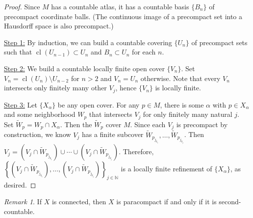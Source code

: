 \documentclass[10pt,letterpaper,cm]{nupset}
\theoremstyle{definition}
\theoremstyle{theorem}
\theoremstyle{remark}
\newtheorem{remark}[definition]{Remark}
\newcommand{\N}{\mathbb N}
\newcommand{\1}{\mathbf{1}}
\newcommand{\0}{\vec 0}
\DeclareMathOperator{\cl}{cl}
\begin{document}
\begin{proof}
Since $M$ has a countable atlas, it has a countable basis $\{B_n\}$ of precompact coordinate balls. (The continuous image of a precompact set into a Hausdorff space is also precompact.)

\medskip


\underline{Step 1:} By induction, we can build a countable covering $\{U_n\}$ of precompact sets such that $\cl(U_{n-1}) \subset U_n$ and $B_n \subset U_n$ for each $n$.

\medskip


\underline{Step 2:} We build a countable locally finite open cover $\{V_n\}$. Set $V_n = \cl(U_n) \setminus U_{n-2}$ for $n > 2$ and $V_n = U_n$ otherwise. Note that every $V_n$ intersects only finitely many other $V_j$, hence $\{V_n\}$ is locally finite.

\medskip


\underline{Step 3:} Let $\{X_\alpha\}$ be any open cover. For any $p \in M$, there is some $\alpha$ with $p\in X_\alpha$ and some neighborhood $W_p$ that intersects $V_j$ for only finitely many natural $j$. Set $\widetilde{W}_p = W_p \cap X_\alpha$. Then the $\widetilde{W}_p$ cover $M$. Since each $V_j$ is precompact by construction, we know $V_j$ has a finite subcover $\widetilde{W}_{p_{j_{k_1}}}, \ldots, \widetilde{W}_{p_{j_{k_j}}}$. Then $V_j = (V_j \cap \widetilde{W}_{p_{j_{k_1}}}) \cup \cdots \cup (V_j \cap \widetilde{W}_{p_{j_{k_j}}})$. Therefore, $\left\{\left(V_j \cap \widetilde{W}_{p_{j_{k_1}}}\right), \ldots, \left(V_j \cap \widetilde{W}_{p_{j_{k_j}}}\right)\right\}_{j \in \N}$ is a locally finite refinement of $\{X_\alpha\}$, as desired.
\end{proof}

\begin{remark}
If $X$ is connected, then $X$ is paracompact if and only if it is second-countable.  
\end{remark}
\end{document}
